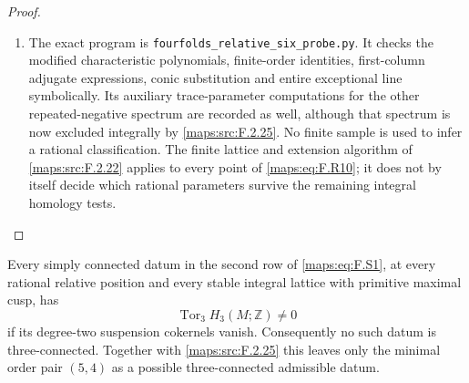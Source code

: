 \begin{proof}
\begin{enumerate}[label={$\langle1\rangle$\arabic*.}]
\item The exact program is
\texttt{fourfolds\_relative\_six\_probe.py}.
It checks the modified characteristic polynomials, finite-order
identities, first-column adjugate expressions, conic
substitution and entire exceptional line symbolically.
Its auxiliary trace-parameter computations for the other
repeated-negative spectrum are recorded as well, although
that spectrum is now excluded integrally by \ref{maps:src:F.2.25}.
No finite sample is used to infer a rational classification.
The finite lattice and extension algorithm of \ref{maps:src:F.2.22} applies
to every point of \eqref{maps:eq:F.R10}; it does not by itself decide
which rational parameters survive the remaining integral
homology tests.

\end{enumerate}
\end{proof}




\begin{theorem}\hypertarget{tag-02NH}{}\label{maps:src:F.2.27}


Every simply connected datum in the second row of \eqref{maps:eq:F.S1},
at every rational relative position and every stable integral
lattice with primitive maximal cusp, has
\[
                 \operatorname{Tor}_3 H_3(M;\mathbb Z)\ne0
\]
if its degree-two suspension cokernels vanish.
Consequently no such datum is three-connected.  Together with
\ref{maps:src:F.2.25} this leaves only the minimal order pair $(5,4)$ as a possible three-connected admissible datum.
\end{theorem}


